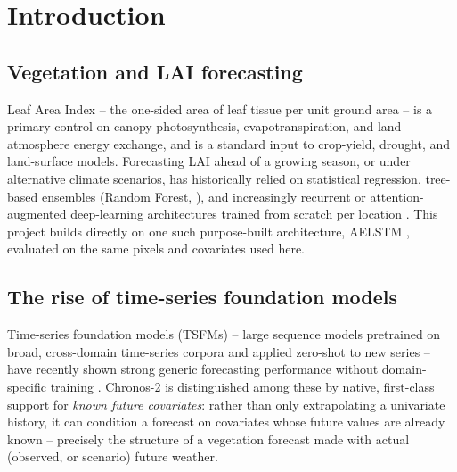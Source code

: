 \documentclass[11pt]{article}
\begin{document}
\begin{abstract}
conditioning head performs statistically indistinguishably whether trained on true or randomly
permuted compositions (paired $t$-test $p=0.245$, $n=70$) -- though with only one tested
architecture reaching this comparison, we report this as no detected benefit under the tested
protocol rather than an identified mechanism. We read this pattern -- modest, site-dependent skill
over a simple climatology baseline, and no adaptation method shown to improve on it -- as a caution
against treating high raw $R^2$ on strongly seasonal targets as evidence of transferred forecasting
skill, and as a case for climatology-referenced evaluation when applying general-purpose TSFMs to
seasonal Earth-system variables.
\end{abstract}

\section{Introduction}
\label{sec:intro}

\subsection{Vegetation and LAI forecasting}
\label{sec:intro-lai}

Leaf Area Index -- the one-sided area of leaf tissue per unit ground area -- is a primary control
on canopy photosynthesis, evapotranspiration, and land--atmosphere energy exchange, and is a
standard input to crop-yield, drought, and land-surface models. Forecasting LAI ahead of a
growing season, or under alternative climate scenarios, has historically relied on statistical
regression, tree-based ensembles (Random Forest, \cite{lai_forecasting_TODO}), and increasingly
recurrent or attention-augmented deep-learning architectures trained from scratch per location
\cite{ts_forecasting_survey_TODO}. This project builds directly on one such purpose-built
architecture, AELSTM \cite{aelstm_TODO}, evaluated on the same pixels and covariates used here.

\subsection{The rise of time-series foundation models}
\label{sec:intro-tsfm}

Time-series foundation models (TSFMs) -- large sequence models pretrained on broad, cross-domain
time-series corpora and applied zero-shot to new series -- have recently shown strong generic
forecasting performance without domain-specific training \cite{ansari2024chronos,tsfm_review_TODO}.
Chronos-2 \citep[Amazon, 2025;][]{ansari2025chronos2} is distinguished among these by native,
first-class support for \emph{known future covariates}: rather than only extrapolating a
univariate history, it can condition a forecast on covariates whose future values are already
known -- precisely the structure of a vegetation forecast made with actual (observed, or
scenario) future weather.
\end{document}
